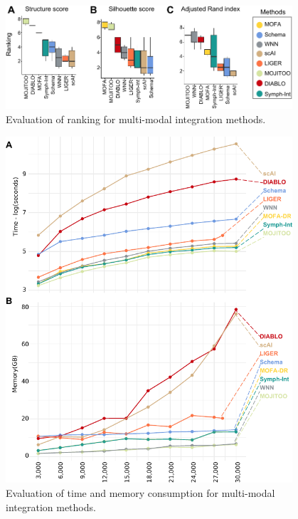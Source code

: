 \begin{figure}[!ht]
	\centering
	\includegraphics[width=0.95\textwidth]{ranking/fig}
	\vspace{0.1cm}
	\caption[Evaluation of ranking for multi-modal integration methods.]{Evaluation of ranking for multi-modal integration methods.}
	\label{fig:ranking}
\end{figure}


\begin{figure}[!ht]
	\centering
	\includegraphics[width=0.95\textwidth]{time_memory/fig}
	\vspace{0.1cm}
	\caption[Evaluation of time and memory consumption for multi-modal integration methods.]{Evaluation of time and memory consumption for multi-modal integration methods.}
	\label{fig:time_memory}
\end{figure}

